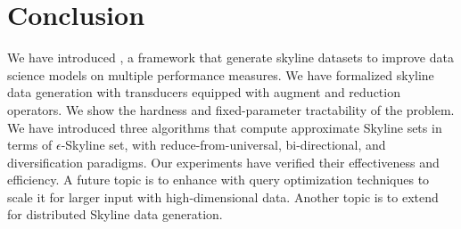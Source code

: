 \section{Conclusion} 
\label{sec:conclude}
We have introduced \modis, 
a framework that generate skyline datasets to improve data science 
models on multiple performance measures. 
We have formalized skyline data generation 
with transducers %
equipped with augment and reduction operators. 
We show the hardness and fixed-parameter 
tractability of the problem. 
We have introduced three algorithms 
that compute approximate Skyline sets 
in terms of $\epsilon$-Skyline set, 
with reduce-from-universal, bi-directional, 
and diversification paradigms. 
Our experiments have verified 
their effectiveness and efficiency. 
A future topic is to 
enhance \modis with query optimization 
techniques to scale it for larger 
input with high-dimensional data.
Another topic is to extend \modis 
for distributed Skyline 
data generation. 

